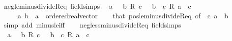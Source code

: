 \begin{isabellebody}
\endisatagproof
{\isafoldproof}%
%
\isadelimproof
\isanewline
%
\endisadelimproof
\isanewline
{}\isamarkupfalse%
\ neg{\isacharunderscore}{\kern0pt}le{\isacharunderscore}{\kern0pt}minus{\isacharunderscore}{\kern0pt}divideR{\isacharunderscore}{\kern0pt}eq\ {\isacharbrackleft}{\kern0pt}field{\isacharunderscore}{\kern0pt}simps{\isacharbrackright}{\kern0pt}{\isacharcolon}{\kern0pt}\isanewline
\ \ {\isachardoublequoteopen}a\ {\isasymle}\ {\isacharminus}{\kern0pt}\ {\isacharparenleft}{\kern0pt}b\ {\isacharslash}{\kern0pt}\isactrlsub R\ c{\isacharparenright}{\kern0pt}\ {\isasymlongleftrightarrow}\ {\isacharminus}{\kern0pt}\ b\ {\isasymle}\ c\ {\isacharasterisk}{\kern0pt}\isactrlsub R\ a{\isachardoublequoteclose}\ \ {\isachardoublequoteopen}c\ {\isacharless}{\kern0pt}\ {}{\isachardoublequoteclose}\isanewline
\ \ \ \ \ a\ b\ {\isacharcolon}{\kern0pt}{\isacharcolon}{\kern0pt}\ {\isachardoublequoteopen}{\isacharprime}{\kern0pt}a\ {\isacharcolon}{\kern0pt}{\isacharcolon}{\kern0pt}\ ordered{\isacharunderscore}{\kern0pt}real{\isacharunderscore}{\kern0pt}vector{\isachardoublequoteclose}\isanewline
%
\isadelimproof
\ \ %
\endisadelimproof
%
\isatagproof
{}\isamarkupfalse%
\ that\ pos{\isacharunderscore}{\kern0pt}le{\isacharunderscore}{\kern0pt}minus{\isacharunderscore}{\kern0pt}divideR{\isacharunderscore}{\kern0pt}eq\ {\isacharbrackleft}{\kern0pt}of\ {\isachardoublequoteopen}{\isacharminus}{\kern0pt}\ c{\isachardoublequoteclose}\ a\ {\isachardoublequoteopen}{\isacharminus}{\kern0pt}\ b{\isachardoublequoteclose}{\isacharbrackright}{\kern0pt}\ \isamarkupfalse%
\ {\isacharparenleft}{\kern0pt}simp\ add{\isacharcolon}{\kern0pt}\ minus{\isacharunderscore}{\kern0pt}le{\isacharunderscore}{\kern0pt}iff{\isacharparenright}{\kern0pt}%
\endisatagproof
{\isafoldproof}%
%
\isadelimproof
\isanewline
%
\endisadelimproof
\ \ \isanewline
{}\isamarkupfalse%
\ neg{\isacharunderscore}{\kern0pt}less{\isacharunderscore}{\kern0pt}minus{\isacharunderscore}{\kern0pt}divideR{\isacharunderscore}{\kern0pt}eq\ {\isacharbrackleft}{\kern0pt}field{\isacharunderscore}{\kern0pt}simps{\isacharbrackright}{\kern0pt}{\isacharcolon}{\kern0pt}\isanewline
\ \ {\isachardoublequoteopen}a\ {\isacharless}{\kern0pt}\ {\isacharminus}{\kern0pt}\ {\isacharparenleft}{\kern0pt}b\ {\isacharslash}{\kern0pt}\isactrlsub R\ c{\isacharparenright}{\kern0pt}\ {\isasymlongleftrightarrow}\ {\isacharminus}{\kern0pt}\ b\ {\isacharless}{\kern0pt}\ c\ {\isacharasterisk}{\kern0pt}\isactrlsub R\ a{\isachardoublequoteclose}\ \ {\isachardoublequoteopen}c\ {\isacharless}{\kern0pt}\ {}{\isachardoublequoteclose}\isanewline

\end{isabellebody}
